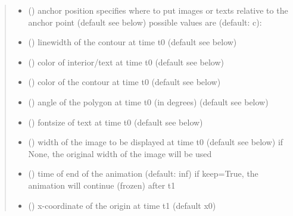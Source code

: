 \documentclass[letterpaper,10pt,english]{sphinxmanual}
\begin{document}
\begin{fulllineitems}
\begin{fulllineitems}
\begin{quote}
\begin{description}
\begin{itemize}
\item {} 
 () \textendash{} anchor position 
specifies where to put images or texts relative to the anchor
point (default see below) 
possible values are (default: c): 

\item {} 
 () \textendash{} linewidth of the contour at time t0 (default see below)

\item {} 
 () \textendash{} color of interior/text at time t0 (default see below)

\item {} 
 () \textendash{} color of the contour at time t0 (default see below)

\item {} 
 () \textendash{} angle of the polygon at time t0 (in degrees) (default see below)

\item {} 
 () \textendash{} fontsize of text at time t0 (default see below)

\item {} 
 () \textendash{} width of the image to be displayed at time t0 (default see below) 
if None, the original width of the image will be used

\item {} 
 () \textendash{} time of end of the animation (default: inf) 
if keep=True, the animation will continue (frozen) after t1

\item {} 
 () \textendash{} x-coordinate of the origin at time t1 (default x0)


\end{itemize}
\end{description}
\end{quote}
\end{fulllineitems}
\end{fulllineitems}
\end{document}
